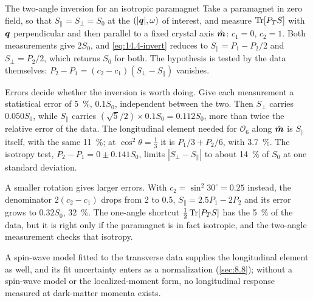 \begin{workedexample}{The two-angle inversion for an isotropic paramagnet}\label{we:14-paramagnet}
Take a paramagnet in zero field, so that $S_\parallel = S_\perp = S_0$ at the $(|\bm{q}|, \omega)$ of interest, and measure $\operatorname{Tr}[P_TS]$ with $\bm{q}$ perpendicular and then parallel to a fixed crystal axis $\hat{\bm{m}}$: $c_1 = 0$, $c_2 = 1$. Both measurements give $2S_0$, and \cref{eq:14.4-invert} reduces to $S_\parallel = P_1 - P_2/2$ and $S_\perp = P_2/2$, which returns $S_0$ for both. The hypothesis is tested by the data themselves: $P_2 - P_1 = (c_2 - c_1)(S_\perp - S_\parallel)$ vanishes.

Errors decide whether the inversion is worth doing. Give each measurement a statistical error of \SI{5}{\percent}, $0.1S_0$, independent between the two. Then $S_\perp$ carries $0.050S_0$, while $S_\parallel$ carries $(\sqrt5/2)\times0.1S_0 = 0.112S_0$, more than twice the relative error of the data. The longitudinal element needed for $\mathcal{O}_6$ along $\hat{\bm{m}}$ is $S_\parallel$ itself, with the same \SI{11}{\percent}; at $\cos^2\theta = \frac13$ it is $P_1/3 + P_2/6$, with \SI{3.7}{\percent}. The isotropy test, $P_2 - P_1 = 0 \pm 0.141S_0$, limits $|S_\perp - S_\parallel|$ to about \SI{14}{\percent} of $S_0$ at one standard deviation.

A smaller rotation gives larger errors. With $c_2 = \sin^2 30^\circ = 0.25$ instead, the denominator $2(c_2 - c_1)$ drops from 2 to 0.5, $S_\parallel = 2.5P_1 - 2P_2$ and its error grows to $0.32S_0$, \SI{32}{\percent}. The one-angle shortcut $\frac12\operatorname{Tr}[P_TS]$ has the \SI{5}{\percent} of the data, but it is right only if the paramagnet is in fact isotropic, and the two-angle measurement checks that isotropy.
\end{workedexample}

A spin-wave model fitted to the transverse data supplies the longitudinal element as well, and its fit uncertainty enters as a normalization (\cref{sec:8.8}); without a spin-wave model or the localized-moment form, no longitudinal response measured at dark-matter momenta exists.
